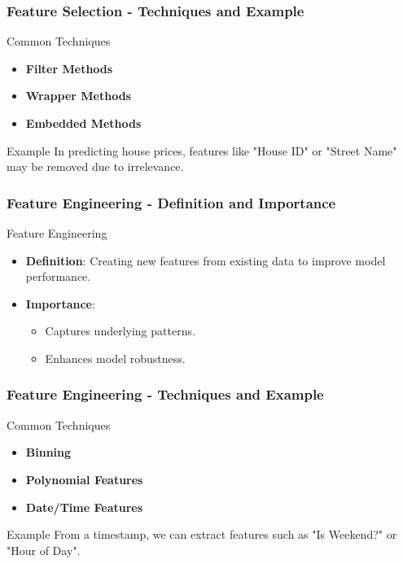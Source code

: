\documentclass[aspectratio=169]{beamer}
\begin{document}
\begin{frame}[fragile]
    \frametitle{Feature Selection - Techniques and Example}
    \begin{block}{Common Techniques}
        \begin{itemize}
            \item \textbf{Filter Methods}
            \item \textbf{Wrapper Methods}
            \item \textbf{Embedded Methods}
        \end{itemize}
    \end{block}
    \begin{block}{Example}
        In predicting house prices, features like "House ID" or "Street Name" may be removed due to irrelevance.
    \end{block}
\end{frame}

\begin{frame}[fragile]
    \frametitle{Feature Engineering - Definition and Importance}
    \begin{block}{Feature Engineering}
        \begin{itemize}
            \item \textbf{Definition}: Creating new features from existing data to improve model performance.
            \item \textbf{Importance}:
                \begin{itemize}
                    \item Captures underlying patterns.
                    \item Enhances model robustness.
                \end{itemize}
        \end{itemize}
    \end{block}
\end{frame}

\begin{frame}[fragile]
    \frametitle{Feature Engineering - Techniques and Example}
    \begin{block}{Common Techniques}
        \begin{itemize}
            \item \textbf{Binning}
            \item \textbf{Polynomial Features}
            \item \textbf{Date/Time Features}
        \end{itemize}
    \end{block}
    \begin{block}{Example}
        From a timestamp, we can extract features such as "Is Weekend?" or "Hour of Day".
    \end{block}
\end{frame}
\end{document}
